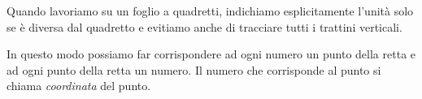 \begin{center} \assed \end{center}

Quando lavoriamo su un foglio a quadretti, indichiamo esplicitamente 
l'unità solo se è diversa dal quadretto e evitiamo anche di tracciare tutti 
i trattini verticali.


\begin{center} \assee \end{center}

In questo modo possiamo far corrispondere ad ogni numero un punto della retta 
e ad ogni punto della retta un numero. Il numero che corrisponde 
al punto si chiama \emph{coordinata} del punto.


\begin{center} \assef \end{center}

